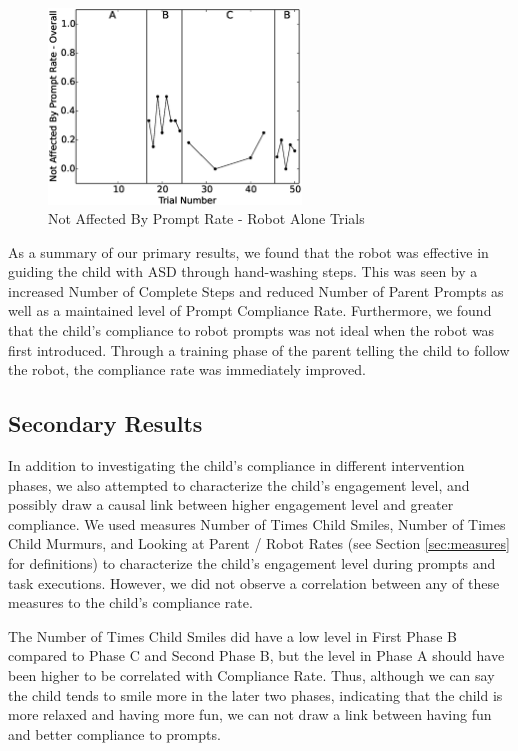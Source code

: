 \documentclass{ut-thesis}
\begin{document}
\begin{figure} [h]
	\centering
	\includegraphics[width=0.6\textwidth]{./img/data_analysis/99NotAffectedByPromptRate-Overall_robotAloneOnly.eps}
	\caption{Not Affected By Prompt Rate - Robot Alone Trials}
	\label{fig:99NotAffectedByPromptRate-Overall_robotAloneOnly}
\end{figure}

As a summary of our primary results, we found that the robot was effective in guiding the child with ASD through hand-washing steps.  This was seen by a increased Number of Complete Steps and reduced Number of Parent Prompts as well as a maintained level of Prompt Compliance Rate.  Furthermore, we found that the child's compliance to robot prompts was not ideal when the robot was first introduced.  Through a training phase of the parent telling the child to follow the robot, the compliance rate was immediately improved.

\subsection{Secondary Results}
In addition to investigating the child's compliance in different intervention phases, we also attempted to characterize the child's engagement level, and possibly draw a causal link between higher engagement level and greater compliance.  We used measures Number of Times Child Smiles, Number of Times Child Murmurs, and Looking at Parent / Robot Rates (see Section \ref{sec:measures} for definitions) to characterize the child's engagement level during prompts and task executions.  However, we did not observe a correlation between any of these measures to the child's compliance rate.

The Number of Times Child Smiles did have a low level in First Phase B compared to Phase C and Second Phase B, but the level in Phase A should have been higher to be correlated with Compliance Rate.  Thus, although we can say the child tends to smile more in the later two phases, indicating that the child is more relaxed and having more fun, we can not draw a link between having fun and better compliance to prompts.
\end{document}
